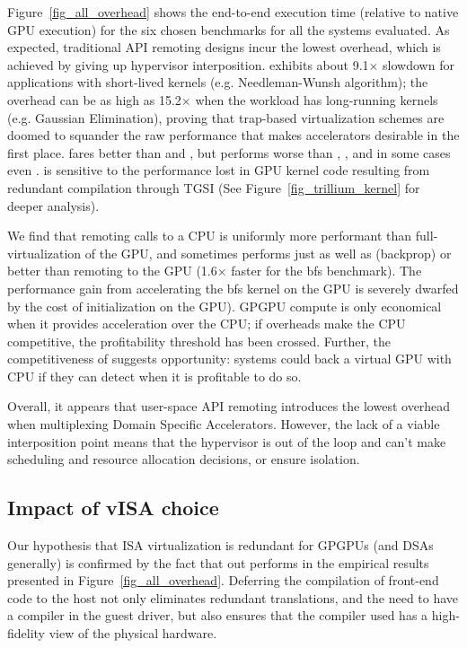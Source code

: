 Figure~\ref{fig_all_overhead} shows the end-to-end execution time (relative to
native GPU execution) for the six chosen benchmarks for all the systems
evaluated. As expected, traditional API remoting designs incur the lowest
overhead, which is achieved by giving up hypervisor interposition.
\gpuvmopt exhibits about 9.1$\times$ slowdown for applications with
short-lived kernels (e.g. Needleman-Wunsh algorithm); the overhead can be as
high as 15.2$\times$ when the workload has long-running kernels (e.g. Gaussian
Elimination), proving that trap-based virtualization schemes are doomed to
squander the raw performance that makes accelerators desirable in the first
place. \XenSVGA fares better than \gpuvmdef and \gpuvmopt, but performs worse
than \apigpu, \Trillium, and in some cases even \apicpu. \XenSVGA is sensitive
to the performance lost in GPU kernel code resulting from redundant
compilation through TGSI (See Figure~\ref{fig_trillium_kernel} for deeper
analysis).

We find that remoting calls to a CPU is uniformly more performant than
full-virtualization of the GPU, and sometimes performs just as well as
(backprop) or better than remoting to the GPU (1.6$\times$ faster for the bfs
benchmark). The performance gain from accelerating the bfs kernel on the GPU
is severely dwarfed by the cost of initialization on the GPU). GPGPU compute
is only economical when it provides acceleration over the CPU; if overheads
make the CPU competitive, the profitability threshold has been crossed.
Further, the competitiveness of \apicpu suggests opportunity: systems could
back a virtual GPU with CPU if they can detect when it is profitable to do so.

Overall, it appears that user-space API remoting introduces the lowest
overhead when multiplexing Domain Specific Accelerators. However, the lack of
a viable interposition point means that the hypervisor is out of the loop and can't make scheduling and resource allocation decisions, or ensure isolation.

\subsection{Impact of vISA choice}

Our hypothesis that ISA virtualization is redundant for GPGPUs (and DSAs
generally) is confirmed by the fact that \Trillium out performs \XenSVGA in
the empirical results presented in Figure~\ref{fig_all_overhead}. Deferring
the compilation of front-end code to the host not only eliminates redundant
translations, and the need to have a compiler in the guest driver, but also
ensures that the compiler used has a high-fidelity view of the physical
hardware.

